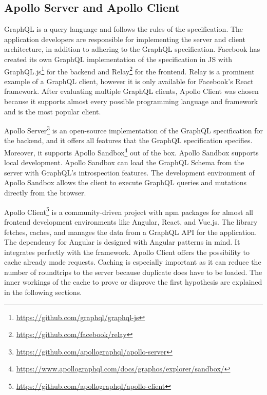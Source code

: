 \subsection{Apollo Server and Apollo Client}\label{subsection:background:graphql:apollo-server-client}

GraphQL is a query language and follows the rules of the specification. The application developers are responsible for implementing the server and client architecture, in addition to adhering to the GraphQL specification. Facebook has created its own GraphQL implementation of the specification in \ac{JS} with GraphQL.js\footnote{\url{https://github.com/graphql/graphql-js}} for the backend and Relay\footnote{\url{https://github.com/facebook/relay}} for the frontend. Relay is a prominent example of a GraphQL client, however it is only available for Facebook's React framework. After evaluating multiple GraphQL clients, Apollo Client was chosen because it supports almost every possible programming language and framework and is the most popular client.

\bigskip

\noindent Apollo Server\footnote{\url{https://github.com/apollographql/apollo-server}} is an open-source implementation of the GraphQL specification for the backend, and it offers all features that the GraphQL specification specifies. Moreover, it supports Apollo Sandbox\footnote{\url{https://www.apollographql.com/docs/graphos/explorer/sandbox/}} out of the box. \cite{misc:-:background:graphql:apollo-server-introduction} Apollo Sandbox supports local development. Apollo Sandbox can load the GraphQL Schema from the server with GraphQL's introspection features. \cite{misc:-:background:graphql:apollo-sandbox} The development environment of Apollo Sandbox allows the client to execute GraphQL queries and mutations directly from the browser.

\bigskip

\noindent Apollo Client\footnote{\url{https://github.com/apollographql/apollo-client}} is a community-driven project with npm packages for almost all frontend development environments like Angular, React, and Vue.js. The library fetches, caches, and manages the data from a GraphQL \ac{API} for the application. The dependency for Angular is designed with Angular patterns in mind. It integrates perfectly with the framework. Apollo Client offers the possibility to cache already made requests. \cite{misc:-:background:graphql:apollo-angular-client-overview, misc:-:background:graphql:apollo-client-overview} Caching is especially important as it can reduce the number of roundtrips to the server because duplicate does have to be loaded. The inner workings of the cache to prove or disprove the first hypothesis are explained in the following sections.

